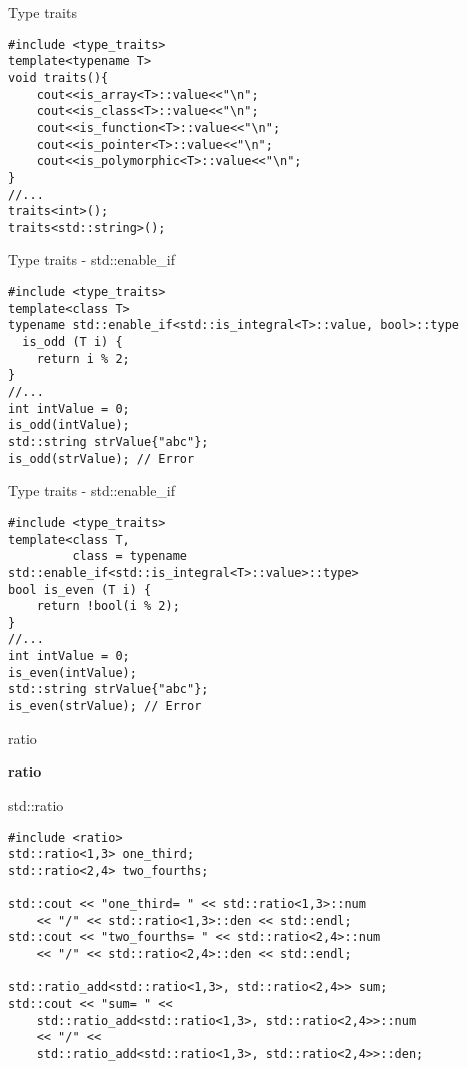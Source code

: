 \documentclass{beamer}
\begin{document}
\begin{frame}[fragile]{Type traits}
\begin{lstlisting}[style=customcpp]
#include <type_traits>
template<typename T>
void traits(){
	cout<<is_array<T>::value<<"\n";
	cout<<is_class<T>::value<<"\n";
	cout<<is_function<T>::value<<"\n";
	cout<<is_pointer<T>::value<<"\n";
	cout<<is_polymorphic<T>::value<<"\n";
}
//...
traits<int>();
traits<std::string>();
\end{lstlisting}
\end{frame}

\begin{frame}[fragile]{Type traits - std::enable\_if}
\begin{lstlisting}[style=customcpp]
#include <type_traits>
template<class T>
typename std::enable_if<std::is_integral<T>::value, bool>::type
  is_odd (T i) {
	return i % 2;
}
//...
int intValue = 0;
is_odd(intValue);
std::string strValue{"abc"};
is_odd(strValue); // Error
\end{lstlisting}
\end{frame}

\begin{frame}[fragile]{Type traits - std::enable\_if}
\begin{lstlisting}[style=customcpp]
#include <type_traits>
template<class T,
         class = typename std::enable_if<std::is_integral<T>::value>::type>
bool is_even (T i) {
	return !bool(i % 2);
}
//...
int intValue = 0;
is_even(intValue);
std::string strValue{"abc"};
is_even(strValue); // Error
\end{lstlisting}
\end{frame}

\begin{frame}[fragile]{ratio}
\begin{center}
{\Huge \textbf{ratio}}
\end{center}
\end{frame}

\begin{frame}[fragile]{std::ratio}
\begin{lstlisting}[style=customcpp]
#include <ratio>
std::ratio<1,3> one_third;
std::ratio<2,4> two_fourths;

std::cout << "one_third= " << std::ratio<1,3>::num
	<< "/" << std::ratio<1,3>::den << std::endl;
std::cout << "two_fourths= " << std::ratio<2,4>::num
	<< "/" << std::ratio<2,4>::den << std::endl;

std::ratio_add<std::ratio<1,3>, std::ratio<2,4>> sum;
std::cout << "sum= " <<
	std::ratio_add<std::ratio<1,3>, std::ratio<2,4>>::num
	<< "/" <<
	std::ratio_add<std::ratio<1,3>, std::ratio<2,4>>::den;

\end{lstlisting}
\end{frame}
\end{document}
